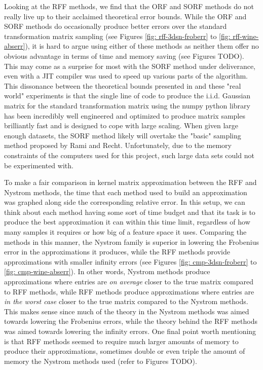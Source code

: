 Looking at the RFF methods, we find that the ORF and SORF methods do not really live up to their acclaimed theoretical error bounds. While the ORF and SORF methods do occasionally produce better errors over the standard transformation matrix sampling (see Figures \ref{fig: rff-3dsn-froberr} to \ref{fig: rff-wine-abserr}), it is hard to argue using either of these methods as neither them offer no obvious advantage in terms of time and memory saving (see Figures TODO). This may come as a surprise for most with the SORF method under deliverance, even with a JIT compiler was used to speed up various parts of the algorithm. This dissonance between the theoretical bounds presented in  and these "real world" experiments is that the single line of code to produce the i.i.d. Gaussian matrix for the standard transformation matrix using the numpy python library has been incredibly well engineered and optimized to produce matrix samples brilliantly fast and is designed to cope with large scaling. When given large enough datasets, the SORF method likely will overtake the "basic" sampling method proposed by Rami and Recht. Unfortunately, due to the memory constraints of the computers used for this project, such large data sets could not be experimented with.

To make a fair comparison in kernel matrix approximation between the RFF and Nystrom methods, the time that each method used to build an approximation was graphed along side the corresponding relative error. In this setup, we can think about each method having some sort of time budget and that its task is to produce the best approximation it can within this time limit, regardless of how many samples it requires or how big of a feature space it uses. Comparing the methods in this manner, the Nystrom family is superior in lowering the Frobenius error in the approximations it produces, while the RFF methods provide approximations with smaller infinity errors (see Figures \ref{fig: cmp-3dsn-froberr} to \ref{fig: cmp-wine-abserr}). In other words, Nystrom methods produce approximations where entries are {\it on average} closer to the true matrix compared to RFF methods, while RFF methods produce approximations where entries are {\it in the worst case} closer to the true matrix compared to the Nystrom methods. This makes sense since much of the theory in the Nystrom methods was aimed towards lowering the Frobenius errors, while the theory behind the RFF methods was aimed towards lowering the infinity errors. One final point worth mentioning is that RFF methods seemed to require much larger amounts of memory to produce their approximations, sometimes double or even triple the amount of memory the Nystrom methods used (refer to Figures TODO).

